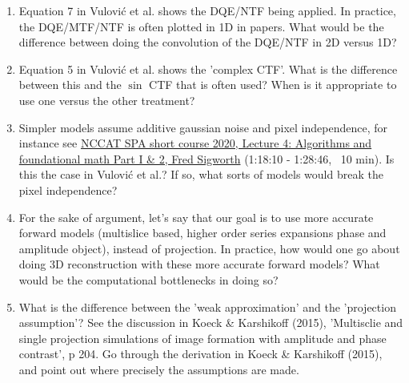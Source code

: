 \documentclass[11pt, oneside]{article}   	%
\begin{document}
\begin{enumerate}
	\item Equation 7 in Vulovi\'{c} et al. shows the DQE/NTF being applied. In practice, the DQE/MTF/NTF is often plotted in 1D in papers. What would be the difference between doing the convolution of the DQE/NTF in 2D versus 1D?
	\item Equation 5 in Vulovi\'{c} et al. shows the 'complex CTF'. What is the difference between this and the $\sin$ CTF that is often used? When is it appropriate to use one versus the other treatment?
	\item Simpler models assume additive gaussian noise and pixel independence, for instance see \href{https://youtu.be/tzv5c5K7MEk?t=4690}{NCCAT SPA short course 2020, Lecture 4: Algorithms and foundational math Part I \& 2, Fred Sigworth} (1:18:10 - 1:28:46, ~10 min). Is this the case in Vulovi\'{c} et al.? If so, what sorts of models would break the pixel independence?
	\item For the sake of argument, let's say that our goal is to use more accurate forward models (multislice based, higher order series expansions phase and amplitude object), instead of projection. In practice, how would one go about doing 3D reconstruction with these more accurate forward models? What would be the computational bottlenecks in doing so?
	\item What is the difference between the 'weak approximation' and the 'projection assumption'? See the discussion in Koeck \& Karshikoff (2015), 'Multisclie and single projection simulations of image formation with amplitude and phase contrast', p 204. Go through the derivation in Koeck \& Karshikoff (2015), and point out where precisely the assumptions are made. 
\end{enumerate}

%	
\end{document}
